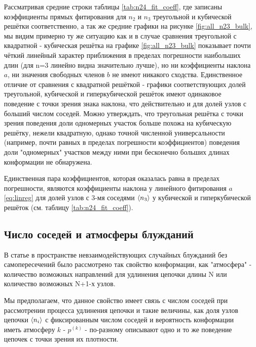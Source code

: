 Рассматривая средние строки таблицы \ref{tab:n24_fit_coeff}, где записаны коэффициенты прямых фитирования для $n_{2}$ и $n_{3}$ треугольной и кубической решётки соответственно, а так же средние графики на рисунке \ref{fig:all_n23_bulk}, мы видим примерно ту же ситуацию как и в случае сравнения треугольной с квадратной - кубическая решётка на графике \ref{fig:all_n23_bulk} показывает почти чёткий линейный характер приближения в пределах погрешности наибольших длин (для n=3 линейно видна значительно лучше), но ни коэффициенты наклона $a$, ни значения свободных членов $b$ не имеют никакого сходства. Единственное отличие от сравнения с квадратной решёткой - графики соответствующих долей треугольной, кубической и гиперкубической решёток имеют одинаковое поведение с точки зрения знака наклона, что действительно и для долей узлов с больший числом соседей. Можно утверждать, что треугольная решётка с точки зрения поведения доли одномерных участок больше похожа на кубическую решётку, нежели квадратную, однако точной численной универсальности (например, почти равных в пределах погрешности коэффициентов) поведения доли "одномерных" участков между ними при бесконечно больших длинах конформации не обнаружена.

Единственная пара коэффициентов, которая оказалась равна в пределах погрешности, являются коэффициенты наклона у линейного фитирования $a$ \eqref{eq:linreg} для долей узлов с 3-мя соседями $\langle n_{3} \rangle$ у кубической и гиперкубической решёток (см. таблицу \ref{tab:n24_fit_coeff}).


\subsection{Число соседей и атмосферы блужданий}

В статье \cite{owczarek2008scaling} в пространстве невзаимодействующих случайных блужданий без самопересечений было рассмотрено так свойство конформации, как "атмосфера" - количество возможных направлений для удлинения цепочки длины N или количество возможных N+1-х узлов.

Мы предполагаем, что данное свойство имеет связь с числом соседей при рассмотрении процесса удлинения цепочки и такие величины, как доля узлов цепочки $\langle n_{i} \rangle$ с фиксированным числом соседей и вероятность конформации иметь атмосферу $k$ - $p^{(k)}$ - по-разному описывают одно и то же поведение цепочек с точки зрения их плотности.

